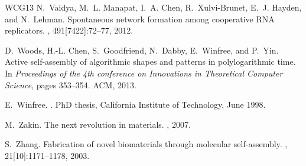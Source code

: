 \documentclass[oribibl, 11pt]{llncs}
\begin{document}
\begin{thebibliography}{WCG{\etalchar{+}}13}
N.~Vaidya, M.~L. Manapat, I.~A. Chen, R.~Xulvi-Brunet, E.~J. Hayden, and
  N.~Lehman.
\newblock Spontaneous network formation among cooperative {RNA} replicators.
, 491[7422]:72--77, 2012.

D.~Woods, H.-L. Chen, S.~Goodfriend, N.~Dabby, E.~Winfree, and P.~Yin.
\newblock Active self-assembly of algorithmic shapes and patterns in
  polylogarithmic time.
\newblock In {\em Proceedings of the 4th conference on Innovations in
  Theoretical Computer Science}, pages 353--354. ACM, 2013.

E.~Winfree.
.
\newblock PhD thesis, California Institute of Technology, June 1998.

M.~Zakin.
\newblock The next revolution in materials.
,
  2007.

S.~Zhang.
\newblock Fabrication of novel biomaterials through molecular self-assembly.
, 21[10]:1171--1178, 2003.

\end{thebibliography}
\end{document}
